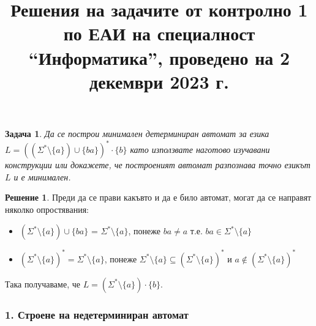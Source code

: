 \documentclass{article}
\newtheorem{problem}{Задача}
\theoremstyle{definition}
\newtheorem*{solution}{Решение}
\begin{document}
\title{Решения на задачите от контролно 1 по ЕАИ на специалност ``Информатика'', проведено на 2 декември 2023 г.}
\date{}

\maketitle

\begin{problem}
Да се построи минимален детерминиран автомат за езика $L = ((\Sigma^* \setminus \{ a \}) \cup \{ ba \})^* \cdot \{ b \}$ като използвате наготово изучавани конструкции или докажете,
че построеният автомат разпознава точно езикът $L$ и е минимален.
\end{problem}

\begin{solution}
    Преди да се прави какъвто и да е било автомат, могат да се направят няколко опростявания:
    \begin{itemize}
        \item $(\Sigma^* \setminus \{ a \}) \cup \{ ba \}$ = $\Sigma^* \setminus \{ a \}$, понеже $ba \neq a$ т.е. $ba \in \Sigma^* \setminus \{ a \}$
        \item $(\Sigma^* \setminus \{ a \})^* = \Sigma^* \setminus \{ a \}$, понеже $\Sigma^* \setminus \{ a \} \subseteq (\Sigma^* \setminus \{ a \})^*$ и $a \notin (\Sigma^* \setminus \{ a \})^*$
    \end{itemize}
    Така получаваме, че $L = (\Sigma^* \setminus \{ a \}) \cdot \{ b \}$.

    \subsubsection*{1. Строене на недетерминиран автомат}


\end{solution}
\end{document}
